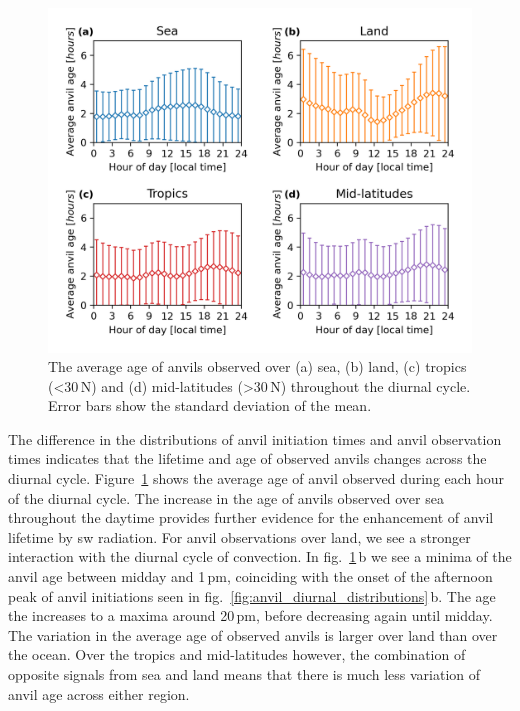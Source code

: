 \begin{figure}[tp]
    \centering
    \includegraphics[width=\textwidth]{figures/chapter2_27.png}
    \caption[
    The average age of anvils observed over sea, land, tropics and mid-latitudes throughout the diurnal cycle.
    ]{
    The average age of anvils observed over (a) sea, (b) land, (c) tropics (\textless 30\,\textdegree N) and (d) mid-latitudes (\textgreater 30\,\textdegree N) throughout the diurnal cycle. Error bars show the standard deviation of the mean.
    }
    \label{fig:anvil_diurnal_age}
\end{figure}

The difference in the distributions of anvil initiation times and anvil observation times indicates that the lifetime and age of observed anvils changes across the diurnal cycle.
Figure~\ref{fig:anvil_diurnal_age} shows the average age of anvil observed during each hour of the diurnal cycle.
The increase in the age of anvils observed over sea throughout the daytime provides further evidence for the enhancement of anvil lifetime by \acrshort{sw} radiation.
For anvil observations over land, we see a stronger interaction with the diurnal cycle of convection.
In fig.~\ref{fig:anvil_diurnal_age}\,b we see a minima of the anvil age between midday and 1\,pm, coinciding with the onset of the afternoon peak of anvil initiations seen in fig.~\ref{fig:anvil_diurnal_distributions}\,b.
The age the increases to a maxima around 20\,pm, before decreasing again until midday.
The variation in the average age of observed anvils is larger over land than over the ocean.
Over the tropics and mid-latitudes however, the combination of opposite signals from sea and land means that there is much less variation of anvil age across either region.


